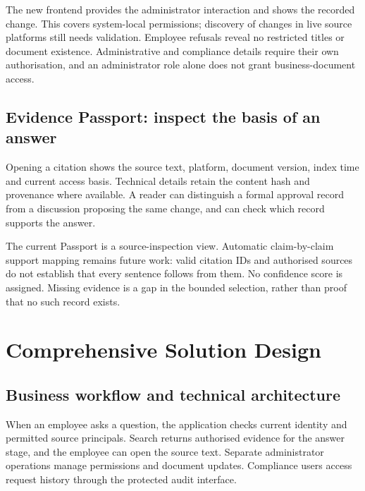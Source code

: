 \documentclass[10pt,a4paper]{article}
\begin{document}
The new frontend provides the administrator interaction and shows the recorded change. This covers system-local permissions; discovery of changes in live source platforms still needs validation. Employee refusals reveal no restricted titles or document existence. Administrative and compliance details require their own authorisation, and an administrator role alone does not grant business-document access.

\subsection{Evidence Passport: inspect the basis of an answer}
Opening a citation shows the source text, platform, document version, index time and current access basis. Technical details retain the content hash and provenance where available. A reader can distinguish a formal approval record from a discussion proposing the same change, and can check which record supports the answer.

The current Passport is a source-inspection view. Automatic claim-by-claim support mapping remains future work: valid citation IDs and authorised sources do not establish that every sentence follows from them. No confidence score is assigned. Missing evidence is a gap in the bounded selection, rather than proof that no such record exists.

\clearpage
\section{Comprehensive Solution Design}
\subsection{Business workflow and technical architecture}
When an employee asks a question, the application checks current identity and permitted source principals. Search returns authorised evidence for the answer stage, and the employee can open the source text. Separate administrator operations manage permissions and document updates. Compliance users access request history through the protected audit interface.
\end{document}
